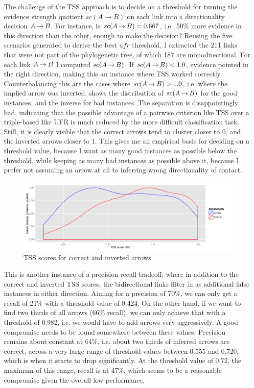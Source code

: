 The challenge of the TSS approach is to decide on a threshold for turning the evidence strength quotient $sc(A \rightarrow B)$ on each link into a directionality decision $A \kern 2pt\hbox{$\rightarrow$}\kern 2pt B$. For instance, is $sc(A \kern 2pt\hbox{$\rightarrow$}\kern 2pt B) = 0.667$, i.e.\ 50\% more evidence in this direction than the other, enough to make the decision? Reusing the five scenarios generated to derive the best $ufr$ threshold, I extracted the 211 links that were not part of the phylogenetic tree, of which 187 are monodirectional. For each link $A \kern 2pt\hbox{$\rightarrow$}\kern 2pt B$ I computed $sc(A \kern 2pt\hbox{$\rightarrow$}\kern 2pt B)$. If $sc(A \kern 2pt\hbox{$\rightarrow$}\kern 2pt B) < 1.0$, evidence pointed in the right direction, making this an instance where TSS worked correctly. Counterbalancing this are the cases where $sc(A \kern 2pt\hbox{$\rightarrow$}\kern 2pt B) > 1.0$, i.e. where the implied arrow was inverted.  shows the distribution of $sc(A \kern 2pt\hbox{$\rightarrow$}\kern 2pt B)$ for the good instances, and the inverse for bad instances. The separation is disappointingly bad, indicating that the possible advantage of a pairwise criterion 
like TSS over a triple-based like UFR is much reduced by the more difficult classification task. Still, it is clearly visible that the correct arrows tend to cluster closer to 0, and the inverted arrows closer to 1. This gives me an empirical basis for deciding on a threshold value, because I want as many good instances as possible below the threshold, while keeping as many bad instances as possible above it, because I prefer not assuming an arrow at all to inferring wrong directionality of contact.

\begin{figure}
 \includegraphics[width=\textwidth]{figures/tss-density.pdf}
 \caption{TSS scores for correct and inverted arrows}
 \label{tss-scores}
\end{figure}

This is another instance of a precision-recall tradeoff, where in addition to the correct and inverted TSS scores, the bidirectional links filter in as additional false instances in either direction. Aiming for a precision of 70\%, we can only get a recall of 21\% with a threshold value of 0.424. On the other hand, if we want to find two thirds of all arrows (66\% recall), we can only achieve that with a threshold of 0.982, i.e. we would have to add arrows very aggressively. A good compromise needs to be found somewhere between these values. Precision remains about constant at 64\%, i.e. about two thirds of inferred arrows are correct, across a very large range of threshold values between 0.555 and 0.720, which is when it starts to drop significantly. At the threshold value of 0.72, the maximum of this range, recall is at 47\%, which seems to be a reasonable compromise given the overall low performance.

